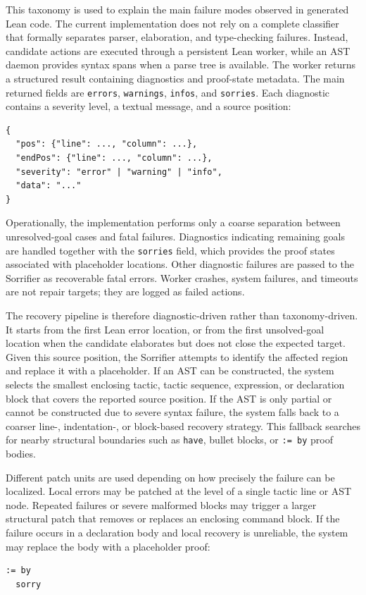 This taxonomy is used to explain the main failure modes observed in generated Lean code. The current
implementation does not rely on a complete classifier that formally separates parser, elaboration, and
type-checking failures. Instead, candidate actions are executed through a persistent Lean worker, while
an AST daemon provides syntax spans when a parse tree is available. The worker returns a structured
result containing diagnostics and proof-state metadata. The main returned fields are
\texttt{errors}, \texttt{warnings}, \texttt{infos}, and \texttt{sorries}. Each diagnostic contains a severity level,
a textual message, and a source position:
\begin{verbatim}
{
  "pos": {"line": ..., "column": ...},
  "endPos": {"line": ..., "column": ...},
  "severity": "error" | "warning" | "info",
  "data": "..."
}
\end{verbatim}

Operationally, the implementation performs only a coarse separation between unresolved-goal cases and
fatal failures. Diagnostics indicating remaining goals are handled together with the \texttt{sorries} field,
which provides the proof states associated with placeholder locations. Other diagnostic failures are passed
to the Sorrifier as recoverable fatal errors. Worker crashes, system failures, and timeouts are not
repair targets; they are logged as failed actions.

The recovery pipeline is therefore diagnostic-driven rather than taxonomy-driven. It starts from the
first Lean error location, or from the first unsolved-goal location when the candidate elaborates but does
not close the expected target. Given this source position, the Sorrifier attempts to identify the
affected region and replace it with a placeholder. If an AST can be constructed, the system selects the
smallest enclosing tactic, tactic sequence, expression, or declaration block that covers the reported
source position. If the AST is only partial or cannot be constructed due to severe syntax failure, the
system falls back to a coarser line-, indentation-, or block-based recovery strategy. This fallback
searches for nearby structural boundaries such as \texttt{have}, bullet blocks, or \texttt{:= by} proof bodies.

Different patch units are used depending on how precisely the failure can be localized. Local errors may
be patched at the level of a single tactic line or AST node. Repeated failures or severe malformed blocks
may trigger a larger structural patch that removes or replaces an enclosing command block. If the failure
occurs in a declaration body and local recovery is unreliable, the system may replace the body with a
placeholder proof:
\begin{verbatim}
:= by
  sorry
\end{verbatim}

